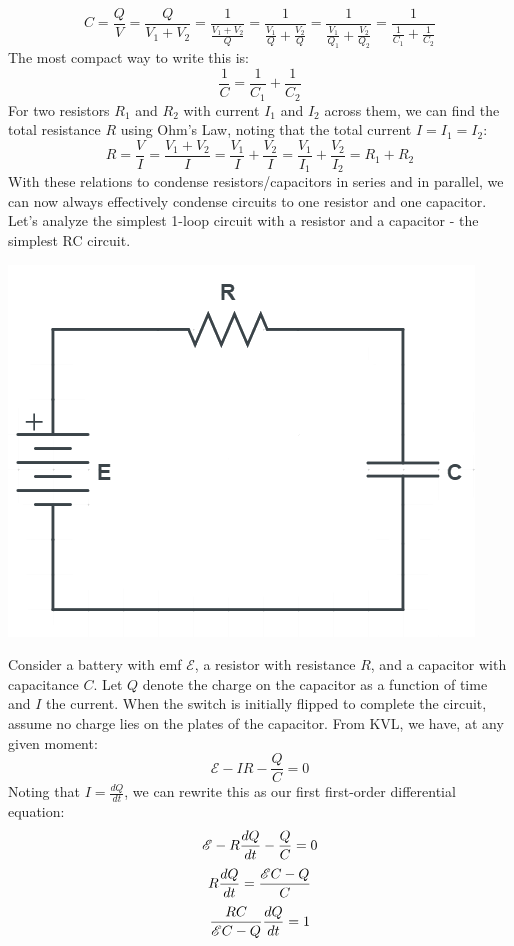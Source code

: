 \[
	C = \frac{Q}{V} = \frac{Q}{V_1+V_2} = \frac{1}{\frac{V_1+V_2}{Q}} = \frac{1}{\frac{V_1}{Q} + \frac{V_2}{Q}} = \frac{1}{\frac{V_1}{Q_1} + \frac{V_2}{Q_2}} = \frac{1}{\frac{1}{C_1} + \frac{1}{C_2}}  
\]
The most compact way to write this is:
\[
	\frac{1}{C} = \frac{1}{C_1} + \frac{1}{C_2}
\]
For two resistors $R_1$ and $R_2$ with current $I_1$ and $I_2$ across them, we can find the total resistance $R$ using Ohm's Law, noting that the total current $I = I_1 = I_2$:
\[
	R = \frac{V}{I} = \frac{V_1 + V_2}{I} = \frac{V_1}{I} + \frac{V_2}{I} = \frac{V_1}{I_1} +  \frac{V_2}{I_2} = R_1 + R_2
\]
With these relations to condense resistors/capacitors in series and in parallel, we can now always effectively condense circuits to one resistor and one capacitor. Let's analyze the simplest 1-loop circuit with a resistor and a capacitor - the simplest RC circuit.
\begin{center}
	\includegraphics[scale=0.25]{images/em/RC-circuit.png}
\end{center}
Consider a battery with emf $\mathscr{E}$, a resistor with resistance $R$, and a capacitor with capacitance $C$. Let $Q$ denote the charge on the capacitor as a function of time and $I$ the current. When the switch is initially flipped to complete the circuit, assume no charge lies on the plates of the capacitor. From KVL, we have, at any given moment:
\[
    \mathscr{E} - IR - \frac{Q}{C} = 0
\]
Noting that $I = \frac{dQ}{dt}$, we can rewrite this as our first first-order differential equation:
\[
    \mathscr{E} - R\frac{d Q}{d t} - \frac{Q}{C} = 0 
\]
\[
    R\frac{d Q}{d t} =  \frac{\mathscr{E}C - Q}{C}  
\]
\[
    \frac{RC}{\mathscr{E}C-Q}\frac{d Q}{d t} = 1
\]
